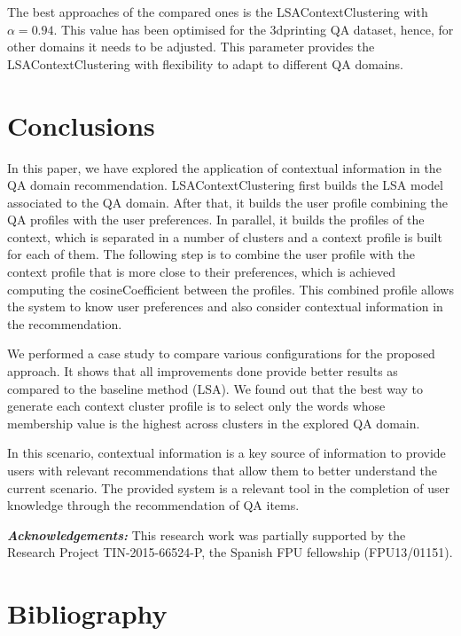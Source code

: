 \documentclass[preprint]{elsarticle}
\begin{document}
\begin{spacing}{2}
The best approaches of the compared ones is the LSAContextClustering with $\alpha=0.94$. This value has been optimised for the 3dprinting QA dataset, hence, for other domains it needs to be adjusted. This parameter provides the LSAContextClustering with flexibility to adapt to different QA domains.

\section{Conclusions}

In this paper, we have explored the application of contextual information in the QA domain recommendation. LSAContextClustering first builds the LSA model associated to the QA domain. After that, it builds the user profile combining the QA profiles with the user preferences. In parallel, it builds the profiles of the context, which is separated in a number of clusters and a context profile is built for each of them. The following step is to combine the user profile with the context profile that is more close to their preferences, which is achieved computing the cosineCoefficient between the profiles. This combined profile allows the system to know user preferences and also consider contextual information in the recommendation. 

We performed a case study to compare various configurations for the proposed approach. It shows that all improvements done provide better results as compared to the baseline method (LSA). We found out that the best way to generate each context cluster profile is to select only the words whose membership value is the highest across clusters in the explored QA domain.

In this scenario, contextual information is a key source of information to provide users with relevant recommendations that allow them to better understand the current scenario. The provided system is a relevant tool in the completion of user knowledge through the recommendation of QA items.

\textbf{\textit{Acknowledgements:}} This research work was partially supported by the Research Project TIN-2015-66524-P, the Spanish FPU fellowship (FPU13/01151).

\section*{Bibliography}



\end{spacing}
\end{document}
